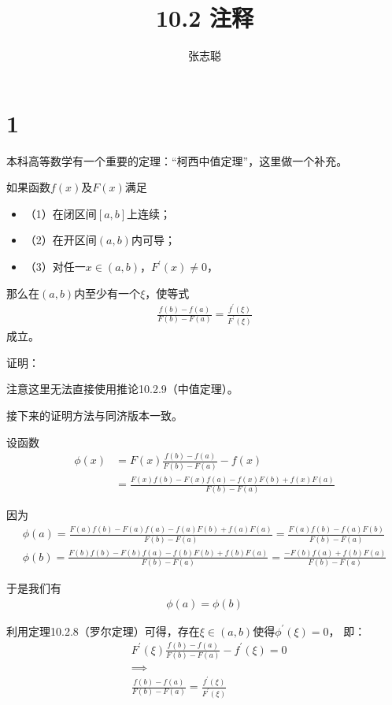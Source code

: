\documentclass{article}
\begin{document}
\title{10.2 注释}
\author{张志聪}
\maketitle

\section*{1}

本科高等数学有一个重要的定理：“柯西中值定理”，这里做一个补充。

\begin{zremark}
  如果函数$f(x)$及$F(x)$满足
  \begin{itemize}
    \item （1）在闭区间$[a, b]$上连续；
    \item （2）在开区间$(a, b)$内可导；
    \item （3）对任一$x \in (a, b)$，$F^\prime(x) \not = 0$，
  \end{itemize}
  那么在$(a, b)$内至少有一个$\xi$，使等式
  \begin{align}
    \frac{f(b) - f(a)}{F(b) - F(a)} = \frac{f^\prime(\xi)}{F^\prime(\xi)}
  \end{align}
  成立。
\end{zremark}

证明：

注意这里无法直接使用推论10.2.9（中值定理）。

接下来的证明方法与同济版本一致。

设函数
\begin{align*}
  \phi(x) & = F(x)\frac{f(b) - f(a)}{F(b) - F(a)} - f(x)                    \\
          & = \frac{F(x)f(b) - F(x)f(a) - f(x)F(b) + f(x)F(a)}{F(b) - F(a)}
\end{align*}

因为
\begin{align*}
  \phi(a) = \frac{F(a)f(b) - F(a)f(a) - f(a)F(b) + f(a)F(a)}{F(b) - F(a)} = \frac{F(a)f(b)- f(a)F(b)}{F(b) - F(a)} \\
  \phi(b) = \frac{F(b)f(b) - F(b)f(a) - f(b)F(b) + f(b)F(a)}{F(b) - F(a)} = \frac{- F(b)f(a) + f(b)F(a)}{F(b) - F(a)}
\end{align*}

于是我们有
\begin{align*}
  \phi(a) = \phi(b)
\end{align*}

利用定理10.2.8（罗尔定理）可得，存在$\xi \in (a, b)$使得$\phi^\prime(\xi) = 0$，
即：
\begin{align*}
   & F^\prime(\xi)\frac{f(b) - f(a)}{F(b) - F(a)} - f^\prime(\xi) = 0      \\
   & \implies                                                              \\
   & \frac{f(b) - f(a)}{F(b) - F(a)} = \frac{f^\prime(\xi)}{F^\prime(\xi)}
\end{align*}
\end{document}
